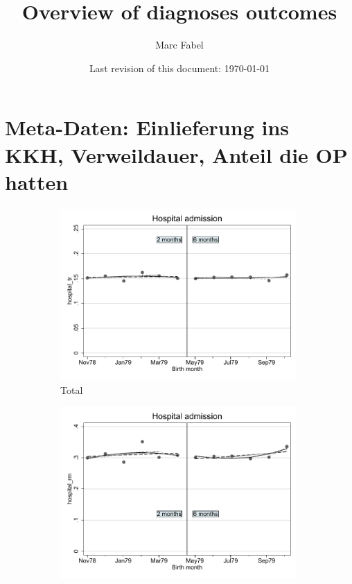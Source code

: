 \documentclass[a4paper ]{article}
\author{Marc Fabel}
\title{Overview of diagnoses outcomes}
\date{Last revision of this document: \today}
\begin{document}
%
\maketitle
\newpage


\section{Meta-Daten: Einlieferung ins KKH, Verweildauer, Anteil die OP hatten}
\begin{figure}[h]
	\centering
	\begin{subfigure}[t]{0.31\textwidth}
		\centering
		\includegraphics[width=0.99\textwidth]{R1_RD_hospital_tr_fits.pdf}
		\caption{Total}		
	\end{subfigure}
	\begin{subfigure}[t]{0.31\textwidth}
		\centering
		\includegraphics[width=0.99\textwidth]{R1_RD_hospital_rm_fits}

\end{subfigure}
\end{figure}
\end{document}
